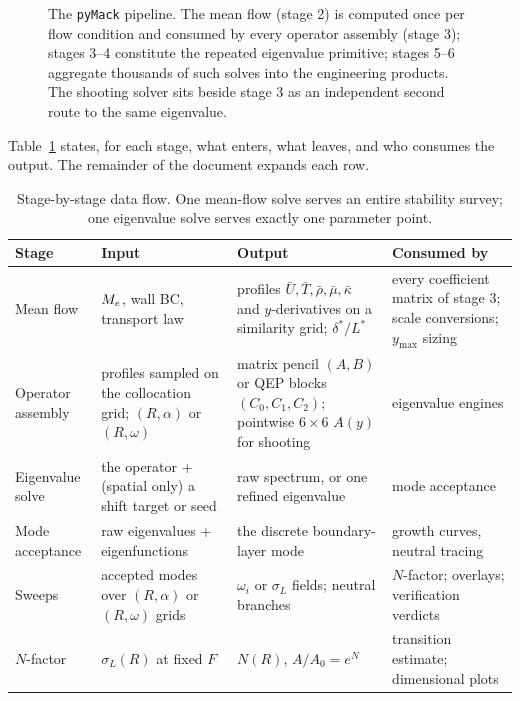\documentclass[11pt]{article}
\begin{document}
\begin{figure}[H]
\caption{The \texttt{pyMack} pipeline. The mean flow (stage 2) is computed once per flow
condition and consumed by every operator assembly (stage 3); stages 3--4 constitute the repeated
eigenvalue primitive; stages 5--6 aggregate thousands of such solves into the engineering
products. The shooting solver sits beside stage 3 as an independent second route to the same
eigenvalue.}\label{fig:pipeline}
\end{figure}

Table~\ref{tab:stages} states, for each stage, what enters, what leaves, and who consumes the
output. The remainder of the document expands each row.

\begin{table}[H]\centering\small
\renewcommand{\arraystretch}{1.3}
\begin{tabular}{@{}>{\raggedright\arraybackslash}p{2.6cm}>{\raggedright\arraybackslash}p{3.4cm}
>{\raggedright\arraybackslash}p{4.2cm}>{\raggedright\arraybackslash}p{4.2cm}@{}}
\toprule
\textbf{Stage} & \textbf{Input} & \textbf{Output} & \textbf{Consumed by} \\
\midrule
Mean flow & $M_e$, wall BC, transport law & profiles $\bar U,\bar T,\bar\rho,\bar\mu,\bar\kappa$
  and $y$-derivatives on a similarity grid; $\delta^*/L^*$ & every coefficient matrix of stage 3;
  scale conversions; $y_{\max}$ sizing \\
Operator assembly & profiles sampled on the collocation grid; $(R,\alpha)$ or $(R,\omega)$ &
  matrix pencil $(A,B)$ or QEP blocks $(C_0,C_1,C_2)$; pointwise $6\times6$ $A(y)$ for shooting &
  eigenvalue engines \\
Eigenvalue solve & the operator + (spatial only) a shift target or seed & raw spectrum, or one
  refined eigenvalue & mode acceptance \\
Mode acceptance & raw eigenvalues + eigenfunctions & the discrete boundary-layer mode &
  growth curves, neutral tracing \\
Sweeps & accepted modes over $(R,\alpha)$ or $(R,\omega)$ grids & $\omega_i$ or $\sigma_L$
  fields; neutral branches & $N$-factor; overlays; verification verdicts \\
$N$-factor & $\sigma_L(R)$ at fixed $F$ & $N(R)$, $A/A_0=e^N$ & transition estimate;
  dimensional plots \\
\bottomrule
\end{tabular}
\caption{Stage-by-stage data flow. One mean-flow solve serves an entire stability survey;
one eigenvalue solve serves exactly one parameter point.}\label{tab:stages}
\end{table}
\end{document}

